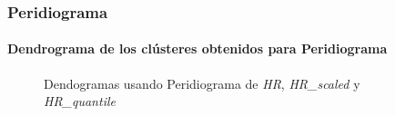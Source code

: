 \subsubsection{Peridiograma}

\paragraph{Dendrograma de los clústeres obtenidos para Peridiograma}

\begin{figure}[H]
    \centering
    
    \caption{Dendogramas usando Peridiograma de \textit{HR}, \textit{HR\_scaled} y \textit{HR\_quantile}}
    \label{fig:per_den_fc}
\end{figure}

